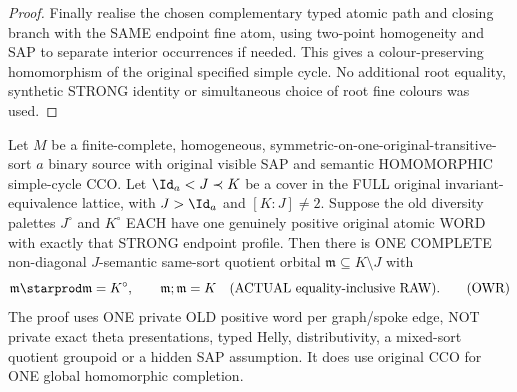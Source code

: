 \begin{proof}
Finally realise the
chosen complementary
typed atomic path and
closing branch with
the SAME endpoint
fine atom, using
two-point homogeneity
and SAP to separate
interior occurrences
if needed. This gives
a colour-preserving
homomorphism of the
original specified
simple cycle.
No additional root
equality, synthetic
STRONG identity or
simultaneous choice of
root fine colours
was used.
\end{proof}

\begin{theorem}
\label{thm:typed-original-full-cover-reset-single-path}
Let $M$ be a finite-complete, homogeneous,
symmetric-on-one-original-transitive-sort $a$
binary source with original visible SAP and
semantic HOMOMORPHIC simple-cycle CCO.
Let $\Id_a<J\prec K$ be a cover in the FULL
original invariant-equivalence lattice,
with $J>\Id_a$ and $[K:J]\ne2$.
Suppose the old diversity palettes
$J^\circ$ and $K^\circ$ EACH have one
genuinely positive original atomic WORD
with exactly that STRONG endpoint profile.
Then there is ONE COMPLETE non-diagonal
$J$-semantic same-sort quotient orbital
$\mathfrak m\subseteq K\setminus J$ with
\[
 \mathfrak m\starprod\mathfrak m=K^\circ,
 \qquad
 \mathfrak m;\mathfrak m=K
 \quad\text{(ACTUAL equality-inclusive RAW).}
 \tag{OWR}\label{eq:typed-original-full-cover-reset}
\]
The proof uses ONE private OLD positive word
per graph/spoke edge, NOT private exact theta
presentations, typed Helly, distributivity,
a mixed-sort quotient groupoid or a hidden
SAP assumption. It does use original CCO
for ONE global homomorphic completion.
\end{theorem}
